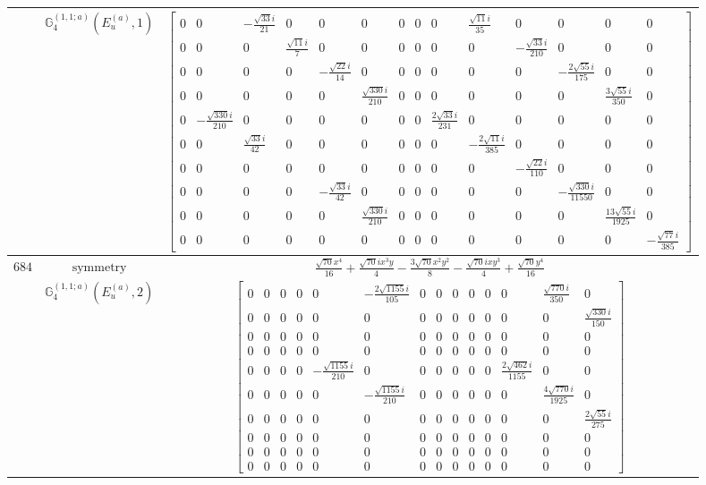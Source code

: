 \documentclass[fleqn,8pt,landscape]{jsarticle}
\begin{document}
\begin{longtable}{ccc}
$  $ & $ \mathbb{G}_{4}^{(1,1;a)}(E_{u}^{(a)},1) $ & $ \begin{bmatrix} 0 & 0 & - \frac{\sqrt{33} i}{21} & 0 & 0 & 0 & 0 & 0 & 0 & \frac{\sqrt{11} i}{35} & 0 & 0 & 0 & 0 \\ 0 & 0 & 0 & \frac{\sqrt{11} i}{7} & 0 & 0 & 0 & 0 & 0 & 0 & - \frac{\sqrt{33} i}{210} & 0 & 0 & 0 \\ 0 & 0 & 0 & 0 & - \frac{\sqrt{22} i}{14} & 0 & 0 & 0 & 0 & 0 & 0 & - \frac{2 \sqrt{55} i}{175} & 0 & 0 \\ 0 & 0 & 0 & 0 & 0 & \frac{\sqrt{330} i}{210} & 0 & 0 & 0 & 0 & 0 & 0 & \frac{3 \sqrt{55} i}{350} & 0 \\ 0 & - \frac{\sqrt{330} i}{210} & 0 & 0 & 0 & 0 & 0 & 0 & \frac{2 \sqrt{33} i}{231} & 0 & 0 & 0 & 0 & 0 \\ 0 & 0 & \frac{\sqrt{33} i}{42} & 0 & 0 & 0 & 0 & 0 & 0 & - \frac{2 \sqrt{11} i}{385} & 0 & 0 & 0 & 0 \\ 0 & 0 & 0 & 0 & 0 & 0 & 0 & 0 & 0 & 0 & - \frac{\sqrt{22} i}{110} & 0 & 0 & 0 \\ 0 & 0 & 0 & 0 & - \frac{\sqrt{33} i}{42} & 0 & 0 & 0 & 0 & 0 & 0 & - \frac{\sqrt{330} i}{11550} & 0 & 0 \\ 0 & 0 & 0 & 0 & 0 & \frac{\sqrt{330} i}{210} & 0 & 0 & 0 & 0 & 0 & 0 & \frac{13 \sqrt{55} i}{1925} & 0 \\ 0 & 0 & 0 & 0 & 0 & 0 & 0 & 0 & 0 & 0 & 0 & 0 & 0 & - \frac{\sqrt{77} i}{385} \end{bmatrix} $ \\ \hline
$ 684 $ & $ \text{symmetry} $ & $ \frac{\sqrt{70} x^{4}}{16} + \frac{\sqrt{70} i x^{3} y}{4} - \frac{3 \sqrt{70} x^{2} y^{2}}{8} - \frac{\sqrt{70} i x y^{3}}{4} + \frac{\sqrt{70} y^{4}}{16} $ \\
$  $ & $ \mathbb{G}_{4}^{(1,1;a)}(E_{u}^{(a)},2) $ & $ \begin{bmatrix} 0 & 0 & 0 & 0 & 0 & - \frac{2 \sqrt{1155} i}{105} & 0 & 0 & 0 & 0 & 0 & 0 & \frac{\sqrt{770} i}{350} & 0 \\ 0 & 0 & 0 & 0 & 0 & 0 & 0 & 0 & 0 & 0 & 0 & 0 & 0 & \frac{\sqrt{330} i}{150} \\ 0 & 0 & 0 & 0 & 0 & 0 & 0 & 0 & 0 & 0 & 0 & 0 & 0 & 0 \\ 0 & 0 & 0 & 0 & 0 & 0 & 0 & 0 & 0 & 0 & 0 & 0 & 0 & 0 \\ 0 & 0 & 0 & 0 & - \frac{\sqrt{1155} i}{210} & 0 & 0 & 0 & 0 & 0 & 0 & \frac{2 \sqrt{462} i}{1155} & 0 & 0 \\ 0 & 0 & 0 & 0 & 0 & - \frac{\sqrt{1155} i}{210} & 0 & 0 & 0 & 0 & 0 & 0 & \frac{4 \sqrt{770} i}{1925} & 0 \\ 0 & 0 & 0 & 0 & 0 & 0 & 0 & 0 & 0 & 0 & 0 & 0 & 0 & \frac{2 \sqrt{55} i}{275} \\ 0 & 0 & 0 & 0 & 0 & 0 & 0 & 0 & 0 & 0 & 0 & 0 & 0 & 0 \\ 0 & 0 & 0 & 0 & 0 & 0 & 0 & 0 & 0 & 0 & 0 & 0 & 0 & 0 \\ 0 & 0 & 0 & 0 & 0 & 0 & 0 & 0 & 0 & 0 & 0 & 0 & 0 & 0 \end{bmatrix} $ \\ \hline

\end{longtable}
\end{document}
